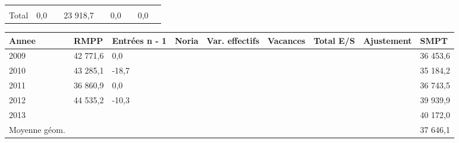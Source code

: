 \begin{longtable}[]{@{}lllllllll@{}}
\begin{minipage}[t]{0.06\columnwidth}
\strut
\end{minipage} & \begin{minipage}[t]{0.13\columnwidth}\raggedright
\strut
\end{minipage} & \begin{minipage}[t]{0.06\columnwidth}\raggedright
\strut
\end{minipage} & \begin{minipage}[t]{0.05\columnwidth}\raggedright
\strut
\end{minipage} & \begin{minipage}[t]{0.06\columnwidth}\raggedright
\strut
\end{minipage}\tabularnewline
\begin{minipage}[t]{0.05\columnwidth}\raggedright
Total\strut
\end{minipage} & \begin{minipage}[t]{0.10\columnwidth}\raggedright
0,0\strut
\end{minipage} & \begin{minipage}[t]{0.06\columnwidth}\raggedright
\strut
\end{minipage} & \begin{minipage}[t]{0.17\columnwidth}\raggedright
23 918,7\strut
\end{minipage} & \begin{minipage}[t]{0.06\columnwidth}\raggedright
\strut
\end{minipage} & \begin{minipage}[t]{0.13\columnwidth}\raggedright
0,0\strut
\end{minipage} & \begin{minipage}[t]{0.06\columnwidth}\raggedright
\strut
\end{minipage} & \begin{minipage}[t]{0.05\columnwidth}\raggedright
0,0\strut
\end{minipage} & \begin{minipage}[t]{0.06\columnwidth}\raggedright
\strut
\end{minipage}\tabularnewline
\bottomrule
\end{longtable}

\begin{longtable}[]{@{}lllllllll@{}}
\toprule
Annee & RMPP & Entrées n - 1 & Noria & Var. effectifs & Vacances & Total
E/S & Ajustement & SMPT\tabularnewline
\midrule
\endhead
2009 & 42 771,6 & 0,0 & & & & & & 36 453,6\tabularnewline
2010 & 43 285,1 & -18,7 & & & & & & 35 184,2\tabularnewline
2011 & 36 860,9 & 0,0 & & & & & & 36 743,5\tabularnewline
2012 & 44 535,2 & -10,3 & & & & & & 39 939,9\tabularnewline
2013 & & & & & & & & 40 172,0\tabularnewline
Moyenne géom. & & & & & & & & 37 646,1\tabularnewline
\bottomrule
\end{longtable}

